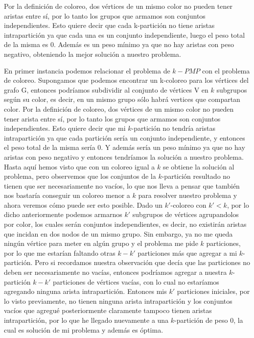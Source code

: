 Por la definición de coloreo, dos vértices de un mismo color no pueden tener aristas entre sí, por lo tanto los grupos que armamos son conjuntos independientes. Esto quiere decir que cada k-partición no tiene aristas intrapartición ya que cada una es un conjunto independiente, luego el peso total de la misma es $0$. Además es un peso mínimo ya que no hay aristas con peso negativo, obteniendo la mejor solución a nuestro problema.


En primer instancia podemos relacionar el problema de $k-PMP$ con el problema de coloreo. Supongamos que podemos encontrar un k-coloreo para los vértices del grafo G, entonces podríamos subdividir al conjunto de vértices V en $k$ subgrupos según su color, es decir, en un mismo grupo sólo habrá vertices que compartan color. Por la definición de coloreo, dos vértices de un mismo color no pueden tener arista entre sí, por lo tanto los grupos que armamos son conjuntos independientes. Esto quiere decir que mi $k$-partición no tendría aristas intrapartición ya que cada partición sería un conjunto independiente, y entonces el peso total de la misma sería $0$. Y además sería un peso mínimo ya que no hay aristas con peso negativo y entonces tendríamos la solución a nuestro problema. Hasta aquí hemos visto que con un coloreo igual a $k$ se obtiene la solución al problema, pero observemos que los conjuntos de la $k$-partición resultado no tienen que ser necesariamente no vacíos, lo que nos lleva a pensar que también nos bastaría conseguir un coloreo menor a $k$ para resolver nuestro problema y ahora veremos cómo puede ser esto posible. Dado un $k'$-coloreo con $k'<k$, por lo dicho anteriormente podemos armarnos $k'$ subgrupos de vértices agrupandolos por color, los cuales serán conjuntos independientes, es decir, no existirán aristas que incidan en dos nodos de un mismo grupo. Sin embargo, ya no me queda ningún vértice para meter en algún grupo y el problema me pide $k$ particiones, por lo que me estarían faltando otras $k-k'$ particiones más que agregar a mi $k$-partición. Pero si recordamos nuestra observación que decía que las particiones no deben ser necesariamente no vacías, entonces podríamos agregar a nuestra $k$-partición $k-k'$ particiones de vértices vacías, con lo cual no estaríamos agregando ninguna arista intrapartición. Entonces mis $k'$ particiones iniciales, por lo visto previamente, no tienen ninguna arista intrapartición y los conjuntos vacíos que agregué posteriormente claramente tampoco tienen aristas intrapartición, por lo que he llegado nuevamente a una $k$-partición de peso $0$, la cual es solución de mi problema y además es óptima.


